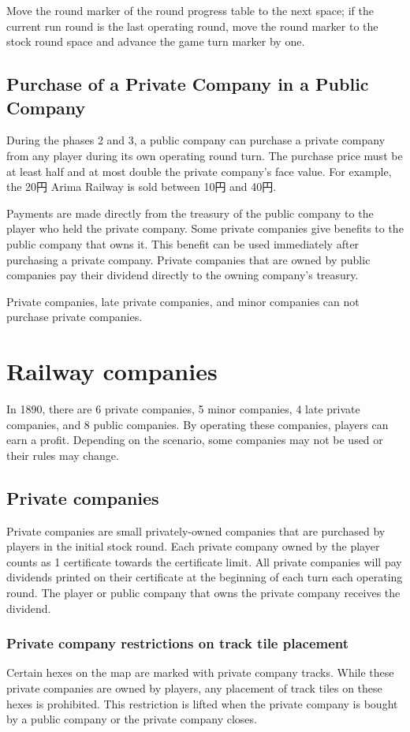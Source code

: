 \documentclass{article}
\begin{document}
\begin{CJK}{UTF8}{min}
\begin{multicols}{2}
Move the round marker of the round progress table to the next space;
if the current run round is the last operating round, move the round marker
to the stock round space and advance the game turn marker by one.

\subsection{Purchase of a Private Company in a Public Company}
\label{or-private-purchase}
During the phases 2 and 3, a public company can purchase a private
company from any player during its own operating round turn.  The
purchase price must be at least half and at most double the private
company's face value. For example, the 20円 Arima Railway is sold
between 10円 and 40円.

Payments are made directly from the treasury of the public company to
the player who held the private company. Some private companies give
benefits to the public company that owns it. This benefit can be used
immediately after purchasing a private company. Private companies that
are owned by public companies pay their dividend directly to the
owning company's treasury.

Private companies, late private companies, and minor companies can
not purchase private companies.


\section{Railway companies}
In 1890, there are 6 private companies, 5 minor companies, 4 late private
companies, and 8 public companies. By operating these companies,
players can earn a profit. Depending on the scenario, some companies
may not be used or their rules may change.

\subsection{Private companies}
Private companies are small privately-owned companies that are
purchased by players in the initial stock round. Each private company
owned by the player counts as 1 certificate towards the certificate
limit. All private companies will pay dividends printed on their
certificate at the beginning of each turn each operating round. The
player or public company that owns the private company receives the
dividend.

\subsubsection{Private company restrictions on track tile placement}
Certain hexes on the map are marked with private company tracks. While
these private companies are owned by players, any placement of track
tiles on these hexes is prohibited. This restriction is lifted when
the private company is bought by a public company or the private
company closes.


\end{multicols}
\end{CJK}
\end{document}
